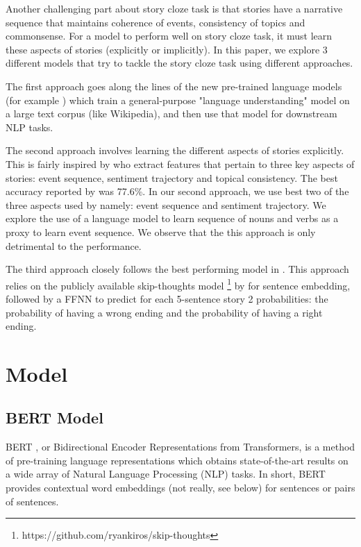 \documentclass{article}
\begin{document}
Another challenging part about story cloze task is that stories have a narrative sequence that maintains coherence of events, consistency of topics and commonsense. For a model to perform well on story cloze task, it must learn these aspects of stories (explicitly or implicitly). In this paper, we explore 3 different models that try to tackle the story cloze task using different approaches.

The first approach goes along the lines of the new pre-trained language models (for example \cite{devlin2018bert}) which train a general-purpose "language understanding" model on a large text corpus (like Wikipedia), and then use that model for downstream NLP tasks.

The second approach involves learning the different aspects of stories explicitly. This is fairly inspired by \cite{hcm} who extract features that pertain to three key aspects of stories: event sequence, sentiment trajectory and topical consistency. The best accuracy reported by \cite{hcm} was 77.6\%. In our second approach, we use best two of the three aspects used by \cite{hcm} namely: event sequence and sentiment trajectory. We explore the use of a language model to learn sequence of nouns and verbs as a proxy to learn event sequence. We observe that the this approach is only detrimental to the performance.

The third approach closely follows the best performing model in \cite{simple_approach}. This approach relies on the publicly available skip-thoughts model \footnote{https://github.com/ryankiros/skip-thoughts} by \cite{skipthoughts} for sentence embedding, followed by a FFNN to predict for each 5-sentence story 2 probabilities: the probability of having a wrong ending and the probability of having a right ending.

\section{Model}

\subsection{BERT Model}
BERT \cite{devlin2018bert}, or Bidirectional Encoder Representations from Transformers, is a method of pre-training language representations which obtains state-of-the-art results on a wide array of Natural Language Processing (NLP) tasks.
In short, BERT provides contextual word embeddings (not really, see below) for sentences or pairs of sentences.
\end{document}
